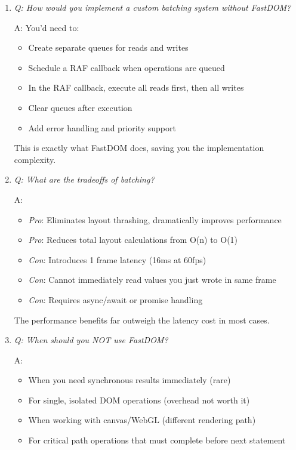 \documentclass[11pt]{article}
\begin{document}
\begin{enumerate}
\item \emph{Q: How would you implement a custom batching system without FastDOM?}

A: You'd need to:
\begin{itemize}
\item Create separate queues for reads and writes
\item Schedule a RAF callback when operations are queued
\item In the RAF callback, execute all reads first, then all writes
\item Clear queues after execution
\item Add error handling and priority support
\end{itemize}

This is exactly what FastDOM does, saving you the implementation complexity.

\item \emph{Q: What are the tradeoffs of batching?}

A: 
\begin{itemize}
\item \emph{Pro}: Eliminates layout thrashing, dramatically improves performance
\item \emph{Pro}: Reduces total layout calculations from O(n) to O(1)
\item \emph{Con}: Introduces 1 frame latency (16ms at 60fps)
\item \emph{Con}: Cannot immediately read values you just wrote in same frame
\item \emph{Con}: Requires async/await or promise handling
\end{itemize}

The performance benefits far outweigh the latency cost in most cases.

\item \emph{Q: When should you NOT use FastDOM?}

A:
\begin{itemize}
\item When you need synchronous results immediately (rare)
\item For single, isolated DOM operations (overhead not worth it)
\item When working with canvas/WebGL (different rendering path)
\item For critical path operations that must complete before next statement
\end{itemize}


\end{enumerate}
\end{document}
